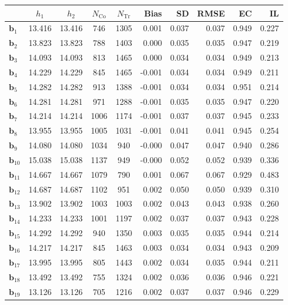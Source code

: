 \documentclass[10pt]{article}
\newcommand{\bb}{\mathbf{b}}
\begin{document}
\begin{table}[p]
    \centering
\begin{tabular}{lccccrrrrr}
\toprule\toprule
 & $h_1$ & $h_2$ & $N_{\mathrm{Co}}$ & $N_{\mathrm{Tr}}$ & Bias & SD & RMSE & EC & IL \\
\midrule
$\bb_{1}$ & 13.416 & 13.416 & 746 & 1305 & 0.001 & 0.037 & 0.037 & 0.949 & 0.227 \\
$\bb_{2}$ & 13.823 & 13.823 & 788 & 1403 & 0.000 & 0.035 & 0.035 & 0.947 & 0.219 \\
$\bb_{3}$ & 14.093 & 14.093 & 813 & 1465 & 0.000 & 0.034 & 0.034 & 0.949 & 0.213 \\
$\bb_{4}$ & 14.229 & 14.229 & 845 & 1465 & -0.001 & 0.034 & 0.034 & 0.949 & 0.211 \\
$\bb_{5}$ & 14.282 & 14.282 & 913 & 1388 & -0.001 & 0.034 & 0.034 & 0.951 & 0.214 \\
$\bb_{6}$ & 14.281 & 14.281 & 971 & 1288 & -0.001 & 0.035 & 0.035 & 0.947 & 0.220 \\
$\bb_{7}$ & 14.214 & 14.214 & 1006 & 1174 & -0.001 & 0.037 & 0.037 & 0.945 & 0.233 \\
$\bb_{8}$ & 13.955 & 13.955 & 1005 & 1031 & -0.001 & 0.041 & 0.041 & 0.945 & 0.254 \\
$\bb_{9}$ & 14.080 & 14.080 & 1034 & 940 & -0.000 & 0.047 & 0.047 & 0.940 & 0.286 \\
$\bb_{10}$ & 15.038 & 15.038 & 1137 & 949 & -0.000 & 0.052 & 0.052 & 0.939 & 0.336 \\
$\bb_{11}$ & 14.667 & 14.667 & 1079 & 790 & 0.001 & 0.067 & 0.067 & 0.929 & 0.483 \\
$\bb_{12}$ & 14.687 & 14.687 & 1102 & 951 & 0.002 & 0.050 & 0.050 & 0.939 & 0.310 \\
$\bb_{13}$ & 13.902 & 13.902 & 1003 & 1003 & 0.002 & 0.043 & 0.043 & 0.938 & 0.260 \\
$\bb_{14}$ & 14.233 & 14.233 & 1001 & 1197 & 0.002 & 0.037 & 0.037 & 0.943 & 0.228 \\
$\bb_{15}$ & 14.292 & 14.292 & 940 & 1350 & 0.003 & 0.035 & 0.035 & 0.944 & 0.214 \\
$\bb_{16}$ & 14.217 & 14.217 & 845 & 1463 & 0.003 & 0.034 & 0.034 & 0.943 & 0.209 \\
$\bb_{17}$ & 13.995 & 13.995 & 805 & 1443 & 0.002 & 0.034 & 0.035 & 0.944 & 0.211 \\
$\bb_{18}$ & 13.492 & 13.492 & 755 & 1324 & 0.002 & 0.036 & 0.036 & 0.946 & 0.221 \\
$\bb_{19}$ & 13.126 & 13.126 & 705 & 1216 & 0.002 & 0.037 & 0.037 & 0.946 & 0.229 \\

\end{tabular}
\end{table}
\end{document}
